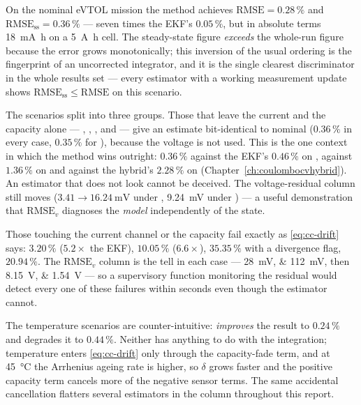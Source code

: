 On the nominal eVTOL mission the method achieves $\text{RMSE}=0.28\,\%$ and
$\text{RMSE}_{\text{ss}}=0.36\,\%$ --- seven times the EKF's $0.05\,\%$, but in absolute terms
\SI{18}{\milli\ampere\hour} on a \SI{5}{\ampere\hour} cell. The steady-state figure \emph{exceeds}
the whole-run figure because the error grows monotonically; this inversion of the usual ordering is
the fingerprint of an uncorrected integrator, and it is the single clearest discriminator in the
whole results set --- every estimator with a working measurement update shows
$\text{RMSE}_{\text{ss}} \le \text{RMSE}$ on this scenario.

The scenarios split into three groups. Those that leave the current and the capacity alone ---
, , ,  and
 --- give an estimate bit-identical to nominal ($0.36\,\%$ in every case, $0.35\,\%$
for ), because the voltage is not used. This is the one context in which the method
wins outright: $0.36\,\%$ against the EKF's $0.46\,\%$ on , against
$1.36\,\%$ on  and against the hybrid's $2.28\,\%$ on 
(Chapter~\ref{ch:coulombocvhybrid}). An estimator that does not look cannot be deceived. The
voltage-residual column still moves ($3.41\to\SI{16.24}{\milli\volt}$ under ,
\SI{9.24}{\milli\volt} under ) --- a useful demonstration that $\text{RMSE}_v$
diagnoses the \emph{model} independently of the state.

Those touching the current channel or the capacity fail exactly as \eqref{eq:cc-drift} says:
 $3.20\,\%$ ($5.2\times$ the EKF),  $10.05\,\%$ ($6.6\times$),
 $35.35\,\%$ with a divergence flag,  $20.94\,\%$. The
$\text{RMSE}_v$ column is the tell in each case --- \SIlist{28;112}{\milli\volt}, then
\SIlist{8.15;1.54}{\volt} --- so a supervisory function monitoring the residual would detect every
one of these failures within seconds even though the estimator cannot.

The temperature scenarios are counter-intuitive:  \emph{improves} the result to
$0.24\,\%$ and  degrades it to $0.44\,\%$. Neither has anything to do with the
integration; temperature enters \eqref{eq:cc-drift} only through the capacity-fade term, and at
\SI{45}{\celsius} the Arrhenius ageing rate is higher, so $\delta$ grows faster and the positive
capacity term cancels more of the negative sensor terms. The same accidental cancellation flatters
several estimators in the  column throughout this report.

